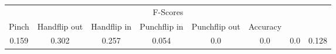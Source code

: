 \documentclass{standalone}
\begin{document}
 
 \begin{tabular}{|c|c|c|c|c|c|c ||c|}
\cline{1-8}\multicolumn{8}{|c|}{F-Scores} \\ 
\cline{1-8}Pinch & Handflip out & Handflip in & Punchflip in & Punchflip out & Accuracy\\ 
\cline{1-8}0.159 & 0.302 & 0.257 & 0.054 & 0.0 & 0.0 & 0.0 & 0.128\\ 
 \cline{1-8}\hline \end{tabular}
 
\end{document}
